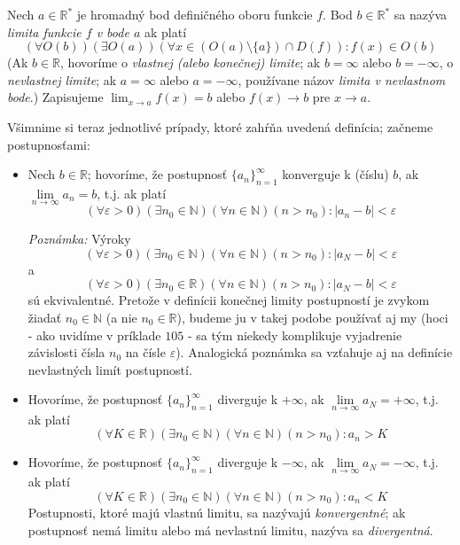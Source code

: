 Nech $a \in \mathbb{R^*}$ je hromadný bod definičného oboru funkcie $f$. Bod $b
\in \mathbb{R^*}$ sa nazýva \textit{limita funkcie $f$ v bode $a$} ak platí
\[
  (\forall O(b)) (\exists O(a)) (\forall x \in (O(a)\setminus \{ a \}) \cap D(f) ):
  f(x) \in O(b)
\]
(Ak $b \in \mathbb{R}$, hovoríme o \textit{vlastnej (alebo konečnej) limite}; ak
$b=\infty$ alebo $b=-\infty$, o \textit{nevlastnej limite}; ak $a=\infty$ alebo
$a=-\infty$, používane názov \textit{limita v nevlastnom bode}.) Zapisujeme
$\lim_{x \rightarrow a} f(x)=b$ alebo $f(x) \rightarrow b$ pre $x \rightarrow
a$.

Všimnime si teraz jednotlivé prípady, ktoré zahŕňa uvedená definícia; začneme
postupnosťami:
\begin{itemize}
\item
  Nech $b \in \mathbb{R}$; hovoríme, že postupnosť ${\{a_n\}}_{n=1}^\infty$
  konverguje k (číslu) $b$, ak $\lim\limits_{n \rightarrow \infty} a_n=b$, t.j.
  ak platí
  \[
    (\forall \varepsilon > 0)
      (\exists n_0 \in \mathbb{N})
        (\forall n \in \mathbb{N}) (n > n_0): |a_n-b| < \varepsilon
  \]

  \textit{Poznámka:} Výroky
  \[
    (\forall \varepsilon > 0)
      (\exists n_0 \in \mathbb{N})
        (\forall n \in \mathbb{N})
          (n > n_0): |a_N - b| < \varepsilon
  \]
  a
  \[
    (\forall \varepsilon > 0)
      (\exists n_0 \in \mathbb{R})
        (\forall n \in \mathbb{N})
          (n > n_0): |a_N - b| < \varepsilon
  \]
  sú ekvivalentné. Pretože v definícii konečnej limity postupností je zvykom
  žiadať $n_0 \in \mathbb{N}$ (a nie $n_0 \in \mathbb{R}$), budeme ju v takej
  podobe používať aj my (hoci - ako uvidíme v príklade $105$ - sa tým niekedy
  komplikuje vyjadrenie závislosti čísla $n_0$ na čísle $\varepsilon$).
  Analogická poznámka sa vzťahuje aj na definície nevlastných limít postupností.
\item
  Hovoríme, že postupnosť ${\{a_n\}}_{n=1}^\infty$ diverguje k $+\infty$, ak
  $\lim\limits_{n \rightarrow \infty} a_N = +\infty$, t.j. ak platí
  \[
    (\forall K \in	\mathbb{R})
      (\exists n_0 \in \mathbb{N})
        (\forall n \in \mathbb{N})
        (n > n_0): a_n>K
  \]
\item
  Hovoríme, že postupnosť ${\{a_n\}}_{n=1}^\infty$ diverguje k $-\infty$, ak
  $\lim\limits_{n \rightarrow \infty} a_N = -\infty$, t.j. ak platí
  \[
    (\forall K \in \mathbb{R})
      (\exists n_0 \in \mathbb{N})
        (\forall n \in \mathbb{N})
          (n > n_0): a_n < K
  \]
  Postupnosti, ktoré majú vlastnú limitu, sa nazývajú \textit{konvergentné}; ak
  postupnosť nemá limitu alebo má nevlastnú limitu, nazýva sa
  \textit{divergentná}.
\end{itemize}

